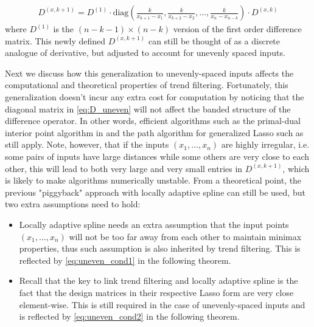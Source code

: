 \documentclass[a4paper]{article}
\begin{document}
\begin{align}
D^{(x,k+1)} = D^{(1)} \cdot \mbox{diag}(\frac{k}{x_{k+1}-x_1}, \frac{k}{x_{k+2} - x_2}, \ldots, \frac{k}{x_n-x_{n-k}}) \cdot D^{(x,k)}
\label{eq:D_uneven}
\end{align}
where $D^{(1)}$ is the $(n-k-1) \times (n-k)$ version of the first order difference matrix. This newly defined $D^{(x, k+1)}$ can still be thought of as a discrete analogue of derivative, but adjusted to account for unevenly spaced inputs.

Next we discuss how this generalization to unevenly-spaced inputs affects the computational and theoretical properties of trend filtering. Fortunately, this generalization doesn't incur any extra cost for computation by noticing that the diagonal matrix in \eqref{eq:D_uneven} will not affect the banded structure of the difference operator. In other words, efficient algorithms such as the primal-dual interior point algorithm in \cite{kim2009ell_1} and the path algorithm for generalized Lasso such as \cite{harchaoui2010multiple,tibshirani2011solution} still apply. Note, however, that if the inputs $(x_1,\ldots, x_n)$ are highly irregular, i.e. some pairs of inputs have large distances while some others are very close to each other, this will lead to both very large and very small entries in $D^{(x,k+1)}$, which is likely to make algorithms numerically unstable. From a theoretical point, the previous "piggyback" approach with locally adaptive spline can still be used, but two extra assumptions need to hold: 

\begin{itemize}
\item Locally adaptive spline needs an extra assumption that the input points $(x_1,\ldots, x_n)$ will not be too far away from each other to maintain minimax properties, thus such assumption is also inherited by trend filtering. This is reflected by \eqref{eq:uneven_cond1} in the following theorem.
\item Recall that the key to link trend filtering and locally adaptive spline is the fact that the design matrices in their respective Lasso form are very close element-wise. This is still required in the case of unevenly-spaced inputs and is reflected by \eqref{eq:uneven_cond2} in the following theorem.
\end{itemize}
\end{document}
